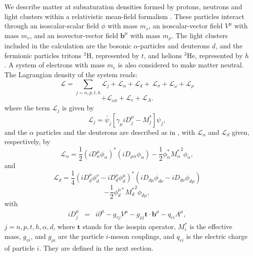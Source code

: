 \documentclass[aps,prc,nofootinbib,twocolumn,showpacs]{revtex4-1}
\begin{document}
We describe matter at subsaturation densities formed by protons, neutrons and
light clusters within a relativistic mean-field formalism \cite{typel10}. 
These particles interact through an isoscalar-scalar field $\phi$ with mass $m_s$,  an isoscalar-vector field $V^{\mu}$ with mass $m_v$, and an isovector-vector field  $\mathbf b^{\mu}$ with mass
$m_\rho$.  The light clusters  included in the calculation are the bosonic $\alpha$-particles and deuterons $d$, and the fermionic particles tritons ${}^3$H, represented by $t$, and  
helions ${}^3$He, represented by $h$.
A system of electrons with mass $m_e$ is also considered to  make matter neutral. 
The Lagrangian density of the system reads:
$$
\mathcal{L}=\sum_{j=n,p,t,h}\mathcal{L}_{j}+\mathcal{L}_{{\alpha }}+
\mathcal{L}_d+ \mathcal{\,L}_{{\sigma }}+ \mathcal{L}_{{\omega }} + 
\mathcal{L}_{{\rho }}
$$
\begin{equation}
 + \mathcal{L}_{\omega \rho} + \mathcal{L}_e +\mathcal{L}_A.
\label{lag}
\end{equation}
%
where the term $\mathcal{L}_{j}$ is given by 
\begin{equation}
\mathcal{L}_{j}=\bar{\psi}_{j}\left[ \gamma _{\mu }iD^{\mu }_j-M^{*}_j\right]
\psi _{j}  \label{lagnucl},
\end{equation}
and the $\alpha$ particles and the deuterons are described as in 
\cite{typel10}, with $\mathcal{L}_{{\alpha }}$ and $\mathcal{L}_d$ given, respectively, by
\begin{equation}
\mathcal{L}_{\alpha }=\frac{1}{2} (i D^{\mu}_{\alpha} \phi_{\alpha})^*
(i D_{\mu \alpha} \phi_{\alpha})-\frac{1}{2}\phi_{\alpha}^* {M^*_{\alpha}}^2
\phi_{\alpha},
\end{equation}
and
$$ \mathcal{L}_{d}=\frac{1}{4} (i D^{\mu}_{d} \phi^{\nu}_{d}-
i D^{\nu}_{d} \phi^{\mu}_{d})^*
(i D_{d\mu} \phi_{d\nu}-i D_{d\nu} \phi_{d\mu})$$
\begin{equation}
-\frac{1}{2}\phi^{\mu *}_{d}{ M^*_{d}}^2
\phi_{d\mu},
\end{equation}
with 
\begin{eqnarray}
iD^{\mu }_j &=&i\partial ^{\mu }-g_{vj}V^{\mu }-g_{\rho j }
{\boldsymbol{t}}%
\cdot \mathbf{b}^{\mu } - q_{ei} A^\mu
, \label{Dmu}
\end{eqnarray}
 $ j=n,p,t,h,\alpha,d$, where  $\boldsymbol {t}$ stands for the isospin operator,
 $M^*_i$ is the effective mass, $g_{vi}$, and $g_{\rho i}$ are
   the particle $i$-meson couplings, and $q_{ei}$ is the electric charge of particle $i$. They are defined in the next section.
\end{document}

